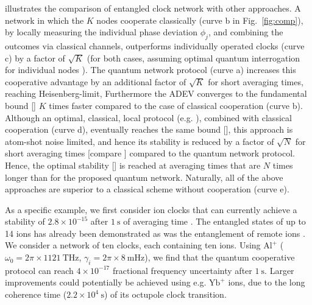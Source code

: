   illustrates the comparison of entangled clock network with
other approaches.
A network in which the $K$ nodes cooperate classically (curve b in
Fig.~\ref{fig:comp}), by locally measuring the individual phase deviation
$\phi_j$, and combining the outcomes via classical channels, outperforms
individually operated clocks (curve c) by a factor of $\sqrt K$ 
(for both cases, assuming optimal
quantum interrogation for individual nodes
\cite{Kessler2013,Borregaard2013Squeezing}).
The quantum network protocol (curve a)
increases this cooperative advantage by an additional factor of $\sqrt K$ for
short averaging times, reaching Heisenberg-limit, Furthermore the ADEV
converges to the fundamental bound [] $K$ times faster compared
to the case of classical cooperation (curve b).
Although an optimal, classical, local protocol
(e.g. \cite{Rosenband:2013vp, Borregaard2013}), combined with classical
cooperation (curve d), eventually reaches the same
bound [],
this approach is atom-shot noise limited, and hence its stability is reduced by
a factor of  $\sqrt N$ for short averaging times [compare ]
compared to the quantum network protocol.  Hence, the optimal stability
[] is reached at averaging times that are $N$ times longer
than for the proposed quantum network. Naturally, all of the above approaches
are superior to a classical scheme without cooperation (curve e).

As a specific example, we first consider ion clocks that can currently achieve a
stability of $2.8\times 10^{-15}$ after $1~\mathrm{s}$ of averaging time
\cite{Chou2010}. The entangled states of up to 14 ions has already been
demonstrated \cite{Monz2011} as was the entanglement of remote ions
\cite{Maunz2007}. We consider a network of ten clocks, each containing ten ions.
Using $\mathrm{Al}^+$ ($\omega_0 = 2\pi \times 1121~\mathrm{THz}$, $\gamma_i = 2\pi
\times 8~\mathrm{mHz}$), we find that the quantum cooperative protocol can reach
$4\times 10^{-17}$ fractional frequency uncertainty after $1~\mathrm{s}$. Larger
improvements could potentially be achieved using e.g. $\mathrm{Yb}^+$ ions, due to the long coherence time ($2.2\times
10^4~\mathrm{s}$) of its octupole clock transition.


